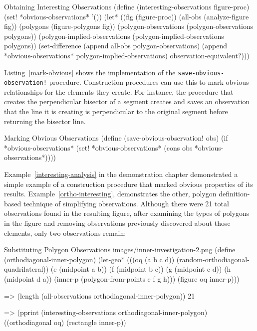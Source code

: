\newpage

\begin{code-listing}
[label=interesting-obs-impl]
{Obtaining Interesting Observations}
(define (interesting-observations figure-proc)
  (set! *obvious-observations* '())
  (let* ((fig (figure-proc))
         (all-obs (analyze-figure fig))
         (polygons (figure-polygons fig))
         (polygon-observations (polygon-observations polygons))
         (polygon-implied-observations
           (polygon-implied-observations polygons))
    (set-difference (append all-obs polygon-observations)
                    (append *obvious-observations* polygon-implied-observations)
                    observation-equivalent?)))
\end{code-listing}

Listing~\ref{mark-obvious} shows the implementation of the
\texttt{save-obvious-observation!} procedure. Construction procedures
can use this to mark obvious relationships for the elements they
create. For instance, the procedure that creates the perpendicular
bisector of a segment creates and saves an observation that the line
it is creating is perpendicular to the original segment before
returning the bisector line.

\begin{code-listing}
[label=mark-obvious]
{Marking Obvious Observations}
(define (save-obvious-observation! obs)
  (if *obvious-observations*
      (set! *obvious-observations*
            (cons obs *obvious-observations*))))
\end{code-listing}

Example~\ref{interesting-analysis} in the demonstration chapter
demonstrated a simple example of a construction procedure that marked
obvious properties of its results. Example~\ref{ortho-interesting},
demonstrates the other, polygon definition-based technique of
simplifying observations. Although there were 21 total observations
found in the resulting figure, after examining the types of polygons
in the figure and removing observations previously discovered about
those elements, only two observations remain:

\begin{img-example}
[label=ortho-interesting]
{Substituting Polygon Observations}
{images/inner-investigation-2.png}
(define (orthodiagonal-inner-polygon)
  (let-geo*
      (((oq (a b c d)) (random-orthodiagonal-quadrilateral))
       (e (midpoint a b))
       (f (midpoint b c))
       (g (midpoint c d))
       (h (midpoint d a))
       (inner-p (polygon-from-points e f g h)))
    (figure oq inner-p)))

=> (length (all-observations orthodiagonal-inner-polygon))
21

=> (pprint (interesting-observations orthodiagonal-inner-polygon)
((orthodiagonal oq) (rectangle inner-p))
\end{img-example}

